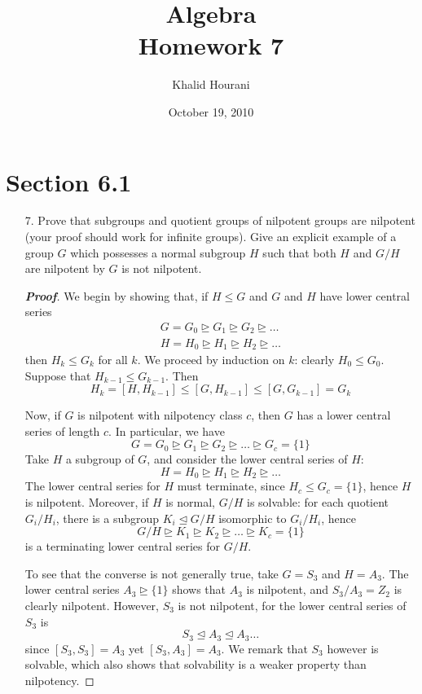 \documentclass[12pt,leqno]{book}
\title{Algebra\\\large Homework 7}
\date{October 19, 2010}
\author{Khalid Hourani}
\theoremstyle{definition}
\newenvironment{Proof}{\begin{proof}[\textnormal{\textbf{Proof}}]}{\end{proof}}
\begin{document}
 \begin{titlepage}
  \maketitle
 \end{titlepage}
\section*{Section 6.1}
\begin{enumerate}
 \item [7.] Prove that subgroups and quotient groups of nilpotent groups are nilpotent (your proof should work for infinite groups). Give an explicit example of a group $G$ which possesses a normal subgroup $H$ such that both $H$ and $G/H$ are nilpotent by $G$ is not nilpotent.

\begin{Proof}
We begin by showing that, if $H\leq G$ and $G$ and $H$ have lower central series \begin{align*}G=G_0\unrhd G_1\unrhd G_2\unrhd\hdots\\H=H_0\unrhd H_1\unrhd H_2\unrhd\hdots\end{align*} then $H_k\leq G_k$ for all $k$. We proceed by induction on $k$: clearly $H_0\leq G_0$. Suppose that $H_{k-1}\leq G_{k-1}$. Then \[H_k=[H,H_{k-1}]\leq[G,H_{k-1}]\leq[G,G_{k-1}]=G_k\] 

Now, if $G$ is nilpotent with nilpotency class $c$, then $G$ has a lower central series of length $c$. In particular, we have \[G=G_0\unrhd G_1\unrhd G_2\unrhd\hdots\unrhd G_c=\{1\}\] Take $H$ a subgroup of $G$, and consider the lower central series of $H$:
\[H=H_0\unrhd H_1\unrhd H_2\unrhd\hdots\] The lower central series for $H$ must terminate, since $H_c\leq G_c=\{1\}$, hence $H$ is nilpotent. Moreover, if $H$ is normal, $G/H$ is solvable: for each quotient $G_i/H_i$, there is a subgroup $K_i\unlhd G/H$ isomorphic to $G_i/H_i$, hence \[G/H\unrhd K_1\unrhd K_2\unrhd\hdots\unrhd K_c=\{1\}\] is a terminating lower central series for $G/H$. 

To see that the converse is not generally true, take $G=S_3$ and $H=A_3$. The lower central series $A_3\unrhd\{1\}$ shows that $A_3$ is nilpotent, and $S_3/A_3=Z_2$ is clearly nilpotent. However, $S_3$ is not nilpotent, for the lower central series of $S_3$ is \[S_3\unlhd A_3\unlhd A_3\hdots\] since $[S_3,S_3]=A_3$ yet $[S_3,A_3]=A_3$. We remark that $S_3$ however is solvable, which also shows that solvability is a weaker property than nilpotency.
\end{Proof}

\end{enumerate}
\end{document}
